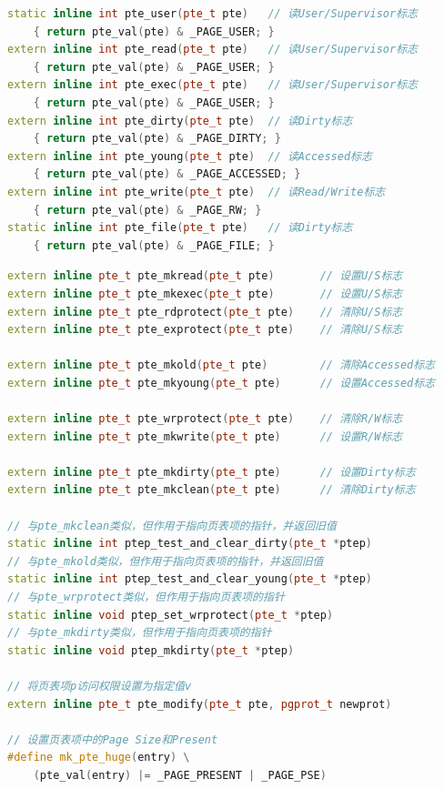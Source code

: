 \begin{lstlisting}[language=C++, caption={读页标志的函数}]
static inline int pte_user(pte_t pte)   // 读User/Supervisor标志
    { return pte_val(pte) & _PAGE_USER; }
extern inline int pte_read(pte_t pte)   // 读User/Supervisor标志
    { return pte_val(pte) & _PAGE_USER; }
extern inline int pte_exec(pte_t pte)   // 读User/Supervisor标志
    { return pte_val(pte) & _PAGE_USER; }
extern inline int pte_dirty(pte_t pte)  // 读Dirty标志
    { return pte_val(pte) & _PAGE_DIRTY; }
extern inline int pte_young(pte_t pte)  // 读Accessed标志
    { return pte_val(pte) & _PAGE_ACCESSED; }
extern inline int pte_write(pte_t pte)	// 读Read/Write标志
    { return pte_val(pte) & _PAGE_RW; }
static inline int pte_file(pte_t pte)   // 读Dirty标志
    { return pte_val(pte) & _PAGE_FILE; }
\end{lstlisting}

\begin{lstlisting}[language=C++, caption={设置页标志的函数}]
extern inline pte_t pte_mkread(pte_t pte)       // 设置U/S标志
extern inline pte_t pte_mkexec(pte_t pte)       // 设置U/S标志
extern inline pte_t pte_rdprotect(pte_t pte)    // 清除U/S标志
extern inline pte_t pte_exprotect(pte_t pte)	// 清除U/S标志

extern inline pte_t pte_mkold(pte_t pte)        // 清除Accessed标志
extern inline pte_t pte_mkyoung(pte_t pte)      // 设置Accessed标志

extern inline pte_t pte_wrprotect(pte_t pte)    // 清除R/W标志
extern inline pte_t pte_mkwrite(pte_t pte)      // 设置R/W标志

extern inline pte_t pte_mkdirty(pte_t pte)      // 设置Dirty标志
extern inline pte_t pte_mkclean(pte_t pte)      // 清除Dirty标志

// 与pte_mkclean类似，但作用于指向页表项的指针，并返回旧值
static inline int ptep_test_and_clear_dirty(pte_t *ptep)
// 与pte_mkold类似，但作用于指向页表项的指针，并返回旧值
static inline int ptep_test_and_clear_young(pte_t *ptep)
// 与pte_wrprotect类似，但作用于指向页表项的指针
static inline void ptep_set_wrprotect(pte_t *ptep)
// 与pte_mkdirty类似，但作用于指向页表项的指针
static inline void ptep_mkdirty(pte_t *ptep)

// 将页表项p访问权限设置为指定值v
extern inline pte_t pte_modify(pte_t pte, pgprot_t newprot)

// 设置页表项中的Page Size和Present
#define mk_pte_huge(entry) \
    (pte_val(entry) |= _PAGE_PRESENT | _PAGE_PSE)
\end{lstlisting}
    
